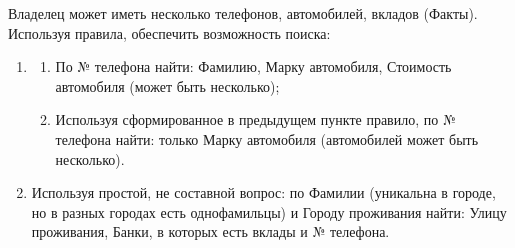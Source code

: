 \documentclass[a4paper,14pt, unknownkeysallowed]{extreport}
\begin{document}
Владелец может иметь несколько телефонов, автомобилей, вкладов (Факты). Используя правила, обеспечить возможность поиска:

\begin{enumerate}
	\item 
		\begin{enumerate}
			\item По № телефона найти: Фамилию, Марку автомобиля, Стоимость автомобиля (может быть несколько);
			\item Используя сформированное в предыдущем пункте правило, по № телефона найти: только Марку автомобиля (автомобилей может быть несколько).
		\end{enumerate}
	\item Используя простой, не составной вопрос: по Фамилии (уникальна в городе, но в разных городах есть однофамильцы) и Городу проживания найти: Улицу проживания, Банки, в которых есть вклады и № телефона.

\end{enumerate}
\end{document}
